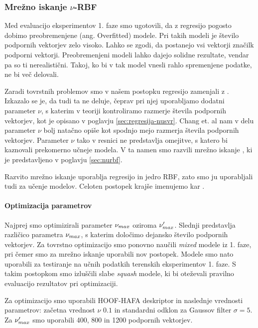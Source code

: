 \subsubsection{Mrežno iskanje \texorpdfstring{$\nu$}{nu}-RBF}
Med evaluacijo eksperimentov 1. faze smo ugotovili, da z regresijo \esvr pogosto dobimo preobremenjene (ang. Overfitted) modele. Pri takih modeli je število podpornih vektorjev zelo visoko. Lahko se zgodi, da postanejo vsi vektorji značilk podporni vektorji. Preobremenjeni modeli lahko dajejo solidne rezultate, vendar pa so ti nerealistični. Takoj, ko bi v tak model vnesli rahlo spremenjene podatke, ne bi več delovali.

Zaradi tovrstnih problemov smo v našem postopku regresijo \esvr zamenjali z \nusvr. Izkazalo se je, da tudi ta ne deluje, čeprav pri njej uporabljamo dodatni parameter $\nu$, s katerim v teoriji kontroliramo razmerje števila podpornih vektorjev, kot je opisano v poglavju \ref{sec:regresija-nusvr}. Chang et. al nam v delu \cite{chang2002training} parameter $\nu$ bolj natačno opiše kot spodnjo mejo razmerja števila podpornih vektorjev. Parameter $\nu$ tako v resnici ne predstavlja omejitve, s katero bi kaznovali prekomerno učneje modela. V ta namen smo razvili mrežno iskanje \nurbf, ki je predstavljeno v poglavju \ref{sec:nurbf}. 

Razvito mrežno iskanje \nurbf uporablja regresijo \nusvr in jedro RBF, zato smo ju uporabljali tudi za učenje modelov. Celoten postopek krajše imenujemo kar \nurbf.

\paragraph{Optimizacija parametrov}
Najprej smo optimizirali parameter $\nu_{max}$ oziroma $\nu_{max}'$. Slednji predstavlja različico parametra $\nu_{max}$, s katerim določimo dejansko število podpornih vektorjev. Za tovrstno optimizacijo smo ponovno naučili \textit{mixed} modele iz 1. faze, pri čemer smo za mrežno iskanje uporabili nov postopek. Modele smo nato uporabili za testiranje na učnih podatkih terenskih eksperimentov 1. faze. S takim postopkom smo izluščili slabe \textit{squash} modele, ki bi oteževali pravilno evaluacijo rezultatov pri optimizaciji.

Za optimizacijo smo uporabili HOOF-HAFA deskriptor in naslednje vrednosti parametrov: začetna vrednost $\nu$ $0.1$ in standardni odklon za Gaussov filter $\sigma=5$. Za $\nu_{max}'$ smo uporabili 400, 800 in 1200 podpornih vektorjev. 


